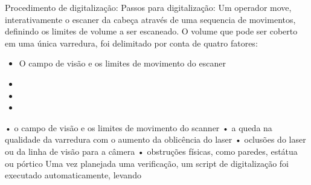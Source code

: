 
Procedimento de digitalização:
Passos para digitalização: Um operador move, interativamente o escaner da cabeça através de uma sequencia de movimentos, definindo os limites de volume a ser escaneado. O volume que pode ser coberto em uma única varredura, foi delimitado por conta de quatro fatores:
\begin{itemize}
\item{O campo de visão e os limites de movimento do escaner}
\item{}
\item{}
\item{}
\end{itemize}
• o campo de visão e os limites de movimento do scanner
• a queda na qualidade da varredura com o aumento da oblicência do laser
• oclusões do laser ou da linha de visão para a câmera
• obstruções físicas, como paredes, estátua ou pórtico
Uma vez planejada uma verificação, um script de digitalização foi executado automaticamente, levando




